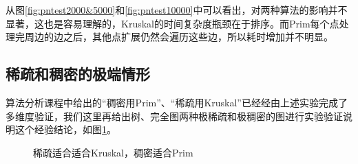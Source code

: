 \documentclass[UTF8]{ctexart}
\begin{document}
从图\ref{fig:pntest2000&5000}和\ref{fig:pntest10000}中可以看出，对两种算法的影响并不显著，这也是容易理解的，Kruskal的时间复杂度瓶颈在于排序。而Prim每个点处理完周边的边之后，其他点扩展仍然会遍历这些边，所以耗时增加并不明显。

\subsection{稀疏和稠密的极端情形}
算法分析课程中给出的“稠密用Prim”、“稀疏用Kruskal”已经经由上述实验完成了多维度验证，我们这里再给出树、完全图两种极稀疏和极稠密的图进行实验验证说明这个经验结论，如图\ref{fig:conclusion}。
\begin{figure}[htbp]
    \centering
    \caption{稀疏适合适合Kruskal，稠密适合Prim}
    \label{fig:conclusion}
\end{figure}
\end{document}
